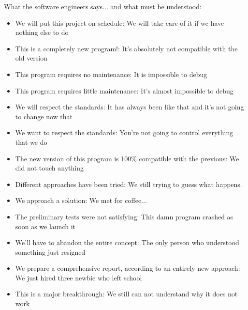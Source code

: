 	\begin{center}\underline{\hspace{5 cm}}\end{center}
	
	What the software engineers says... and what must be understood:
	\begin{itemize}
		\item We will put this project on schedule: We will take care of it if we have nothing else to do
	
		\item This is a completely new program!: It's absolutely not compatible with the old version
	
		\item This program requires no maintenance: It is impossible to debug
	
		\item This program requires little maintenance: It's almost impossible to debug
	
		\item We will respect the standards: It has always been like that and it's not going to change now that
	
		\item We want to respect the standards: You're not going to control everything that we do
	
		\item The new version of this program is 100\% compatible with the previous: We did not touch anything
	
		\item Different approaches have been tried: We still trying to guess what happens.
	
		\item We approach a solution: We met for coffee...
	
		\item The preliminary tests were not satisfying: This damn program crashed as soon as we launch it
	
		\item We'll have to abandon the entire concept: The only person who understood something just resigned
	
		\item We prepare a comprehensive report, according to an entirely new approach: We just hired three newbie who left school
	
		\item This is a major breakthrough: We still can not understand why it does not work
	

\end{itemize}
